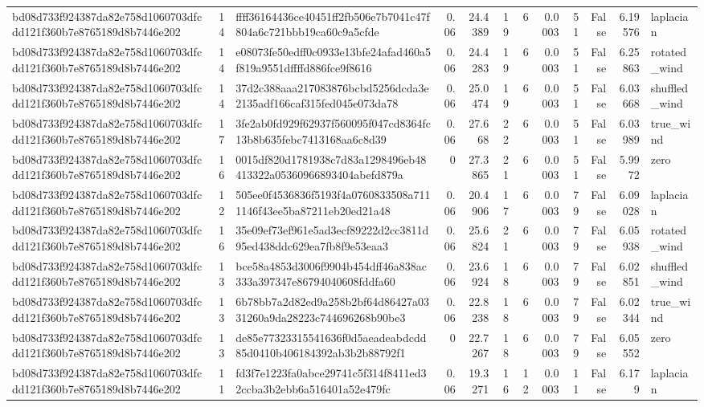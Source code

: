 \begin{tabular}{lrlrrrrrrrrl}
bd08d733f924387da82e758d1060703dfcdd121f360b7e8765189d8b7446e202 & 14 & ffff36164436ce40451ff2fb506e7b7041c47f804a6c721bbb19ca60c9a5cfde & 0.06 & 24.4389 & 19 & 6 & 0.0003 & 51 & False & 6.19576 & laplacian \\
bd08d733f924387da82e758d1060703dfcdd121f360b7e8765189d8b7446e202 & 14 & e08073fe50edff0c0933e13bfe24afad460a5f819a9551dffffd886fce9f8616 & 0.06 & 24.4283 & 19 & 6 & 0.0003 & 51 & False & 6.25863 & rotated\_wind \\
bd08d733f924387da82e758d1060703dfcdd121f360b7e8765189d8b7446e202 & 14 & 37d2c388aaa217083876bcbd5256dcda3e2135adf166caf315fed045e073da78 & 0.06 & 25.0474 & 19 & 6 & 0.0003 & 51 & False & 6.03668 & shuffled\_wind \\
bd08d733f924387da82e758d1060703dfcdd121f360b7e8765189d8b7446e202 & 17 & 3fe2ab0fd929f62937f560095f047cd8364fc13b8b635febc7413168aa6c8d39 & 0.06 & 27.668 & 22 & 6 & 0.0003 & 51 & False & 6.03989 & true\_wind \\
bd08d733f924387da82e758d1060703dfcdd121f360b7e8765189d8b7446e202 & 16 & 0015df820d1781938c7d83a1298496eb48413322a05360966893404abefd879a & 0 & 27.3865 & 21 & 6 & 0.0003 & 51 & False & 5.9972 & zero \\
bd08d733f924387da82e758d1060703dfcdd121f360b7e8765189d8b7446e202 & 12 & 505ee0f4536836f5193f4a0760833508a7111146f43ee5ba87211eb20ed21a48 & 0.06 & 20.4906 & 17 & 6 & 0.0003 & 79 & False & 6.09028 & laplacian \\
bd08d733f924387da82e758d1060703dfcdd121f360b7e8765189d8b7446e202 & 16 & 35e09ef73ef961e5ad3ecf89222d2cc3811d95ed438ddc629ea7fb8f9e53eaa3 & 0.06 & 25.6824 & 21 & 6 & 0.0003 & 79 & False & 6.05938 & rotated\_wind \\
bd08d733f924387da82e758d1060703dfcdd121f360b7e8765189d8b7446e202 & 13 & bce58a4853d3006f9904b454dff46a838ac333a397347e86794040608fddfa60 & 0.06 & 23.6924 & 18 & 6 & 0.0003 & 79 & False & 6.02851 & shuffled\_wind \\
bd08d733f924387da82e758d1060703dfcdd121f360b7e8765189d8b7446e202 & 13 & 6b78bb7a2d82ed9a258b2bf64d86427a0331260a9da28223c744696268b90be3 & 0.06 & 22.8238 & 18 & 6 & 0.0003 & 79 & False & 6.02344 & true\_wind \\
bd08d733f924387da82e758d1060703dfcdd121f360b7e8765189d8b7446e202 & 13 & de85e77323315541636f0d5aeadeabdcdd85d0410b406184392ab3b2b88792f1 & 0 & 22.7267 & 18 & 6 & 0.0003 & 79 & False & 6.05552 & zero \\
bd08d733f924387da82e758d1060703dfcdd121f360b7e8765189d8b7446e202 & 11 & fd3f7e1223fa0abce29741c5f314f8411ed32ccba3b2ebb6a516401a52e479fc & 0.06 & 19.3271 & 16 & 12 & 0.0003 & 11 & False & 6.179 & laplacian \\

\end{tabular}
